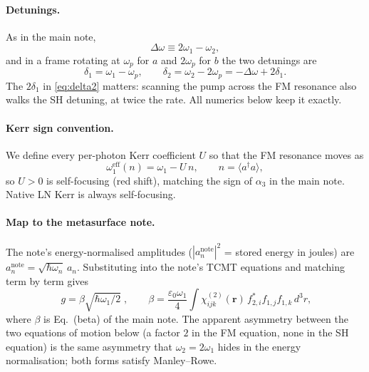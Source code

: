 \documentclass[11pt,a4paper]{article}
\newcommand{\eps}{\varepsilon}
\newcommand{\bvec}[1]{\mathbf{#1}}
\newcommand{\chitwo}{\chi^{(2)}}
\newcommand{\Dom}{\Delta\omega}
\begin{document}
\paragraph{Detunings.}  As in the main note,
\begin{equation}
  \Dom\equiv2\omega_1-\omega_2 ,
\end{equation}
and in a frame rotating at $\omega_p$ for $a$ and $2\omega_p$ for $b$
the two detunings are
\begin{equation}
  \delta_1=\omega_1-\omega_p,\qquad
  \delta_2=\omega_2-2\omega_p=-\Dom+2\delta_1 .
  \label{eq:delta2}
\end{equation}
The $2\delta_1$ in \eqref{eq:delta2} matters: scanning the pump across
the FM resonance also walks the SH detuning, at twice the rate.  All
numerics below keep it exactly.

\paragraph{Kerr sign convention.}  We define every per-photon Kerr
coefficient $U$ so that the FM resonance moves as
\begin{equation}
  \omega_1^{\text{eff}}(n)=\omega_1-U\,n ,\qquad n=\langle a^\dagger a\rangle ,
  \label{eq:Usign}
\end{equation}
so $U>0$ is self-focusing (red shift), matching the sign of $\alpha_3$
in the main note.  Native LN Kerr is always self-focusing.

\paragraph{Map to the metasurface note.}  The note's energy-normalised
amplitudes ($|a_n^{\text{note}}|^2$ = stored energy in joules) are
$a_n^{\text{note}}=\sqrt{\hbar\omega_n}\,a_n$.  Substituting into the
note's TCMT equations and matching term by term gives
\begin{equation}
  \boxed{\;g=\beta\sqrt{\hbar\omega_1/2}\;},\qquad
  \beta=\frac{\eps_0\omega_1}{4}\!\int\!\chitwo_{ijk}(\bvec r)\,
        f^*_{2,i}f_{1,j}f_{1,k}\,d^3r ,
  \label{eq:g-beta}
\end{equation}
where $\beta$ is Eq.~(beta) of the main note.  The apparent asymmetry
between the two equations of motion below (a factor $2$ in the FM
equation, none in the SH equation) is the same asymmetry that
$\omega_2=2\omega_1$ hides in the energy normalisation; both forms
satisfy Manley--Rowe.

\end{document}
